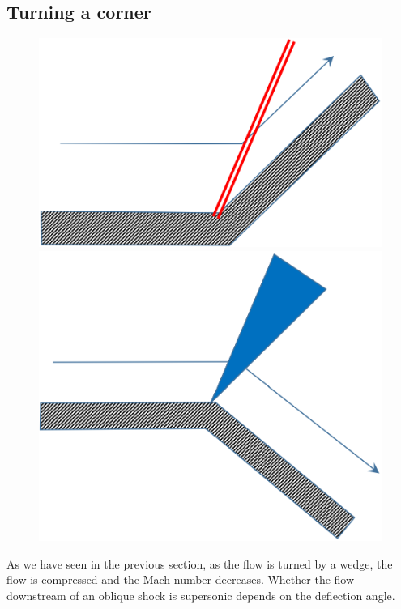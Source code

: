\documentclass[class=report, crop=false, 12pt,a4paper]{standalone}
\begin{document}
\subsection{Turning a corner}
\begin{figure}[H]
    \centering
    \begin{minipage}{.5\textwidth}
        \centering
        \includegraphics[width=.8\linewidth]{../img/diagram28.png}
    \end{minipage}%
    \begin{minipage}{.5\textwidth}
        \centering
        \includegraphics[width=.8\linewidth]{../img/diagram29.png}
    \end{minipage}
\end{figure}
As we have seen in the previous section, as the flow is turned by a wedge, the flow is compressed and the Mach number decreases. Whether the flow downstream of an oblique shock is supersonic depends on the deflection angle.
\end{document}

